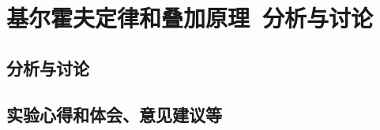 \documentclass[dvipsnames, svgnames,a4paper,11pt]{article}
\newcommand{\exname}{基尔霍夫定律和叠加原理}%
\begin{document}
\section{\exname\ \textbf{分析与讨论}}
\subsection{分析与讨论}
\newpage
\vspace*{\fill}
\subsection{实验心得和体会、意见建议等}
\vspace*{\fill}
\clearpage
%
%


%
%
	
	

\end{document}

